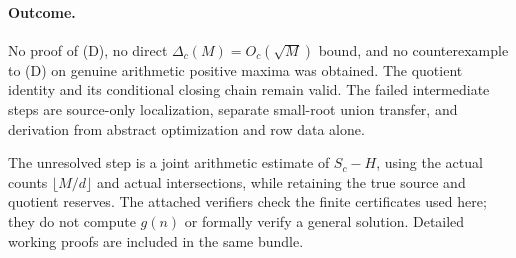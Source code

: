 \documentclass[11pt]{article}
\begin{document}
\paragraph{Outcome.}
No proof of (D), no direct $\Delta_c(M)=O_c(\sqrt M)$ bound, and no
counterexample to (D) on genuine arithmetic positive maxima was obtained.
The quotient identity and its conditional closing chain remain valid.
The failed intermediate steps are source-only localization, separate
small-root union transfer, and derivation from abstract optimization
and row data alone.

The unresolved step is a joint arithmetic estimate of $S_c-H$, using
the actual counts $\lfloor M/d\rfloor$ and actual intersections, while
retaining the true source and quotient reserves. The attached verifiers
check the finite certificates used here; they do not compute $g(n)$ or
formally verify a general solution. Detailed working proofs are included
in the same bundle.
\end{document}

